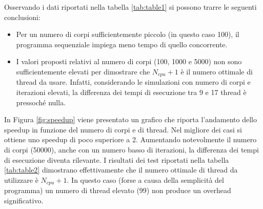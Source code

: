 \documentclass[12pt,a4paper,openright,twoside]{book}
\begin{document}
Osservando i dati riportati nella tabella \ref{tab:table1}
si possono trarre le seguenti conclusioni:
\begin{itemize}
	\item Per un numero di corpi sufficientemente piccolo (in questo caso 100),
	il programma sequenziale impiega meno tempo di quello concorrente.
	\item I valori proposti relativi al numero di corpi (100, 1000 e 5000) non sono sufficientemente elevati per
	dimostrare che $N_{cpu}+1$ è il numero ottimale di thread da usare. Infatti, considerando
	le simulazioni con numero di corpi e iterazioni elevati, la differenza dei tempi di esecuzione tra 9 e 17 thread è pressoché nulla.
\end{itemize}

In Figura \ref{fig:speedup} viene presentato un grafico che riporta l'andamento dello speedup in funzione del numero di corpi e di thread.
Nel migliore dei casi si ottiene uno speedup di poco superiore a 2.
Aumentando notevolmente il numero di corpi (50000), anche con un numero basso di iterazioni,
la differenza dei tempi di esecuzione diventa rilevante.
I risultati dei test riportati nella tabella \ref{tab:table2} dimostrano effettivamente che
il numero ottimale di thread da utilizzare è $N_{cpu} + 1$. In questo caso (forse a causa della semplicità del programma)
un numero di thread elevato (99) non produce un overhead significativo.
\end{document}
